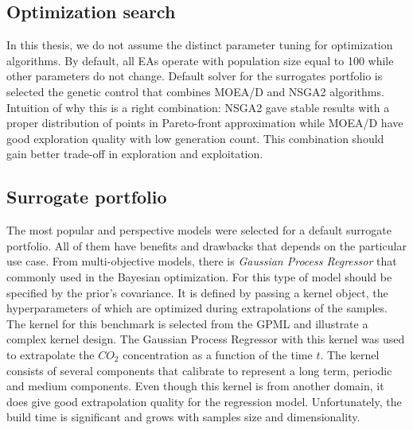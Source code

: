     \subsection{Optimization search}
    In this thesis, we do not assume the distinct parameter tuning for optimization algorithms. By default, all EAs operate with population size equal to 100 while other parameters do not change. Default solver for the surrogates portfolio is selected the genetic control that combines MOEA/D and NSGA2 algorithms. Intuition of why this is a right combination: NSGA2 gave stable results with a proper distribution of points in Pareto-front approximation while MOEA/D have good exploration quality with low generation count. This combination should gain better trade-off in exploration and exploitation.


    \subsection{Surrogate portfolio}
    The most popular and perspective models were selected for a default surrogate portfolio. All of them have benefits and drawbacks that depends on the particular use case. From multi-objective models, there is \emph{Gaussian Process Regressor} that commonly used in the Bayesian optimization. For this type of model should be specified by the prior's covariance. It is defined by passing a kernel object, the hyperparameters of which are optimized during extrapolations of the samples. The kernel for this benchmark is selected from the GPML\cite{RasmussenN10} and illustrate a complex kernel design. The Gaussian Process Regressor with this kernel was used to extrapolate the $CO_2$ concentration as a function of the time $t$. The kernel consists of several components that calibrate to represent a long term, periodic and medium components. Even though this kernel is from another domain, it does give good extrapolation quality for the regression model. Unfortunately, the build time is significant and grows with samples size and dimensionality.

